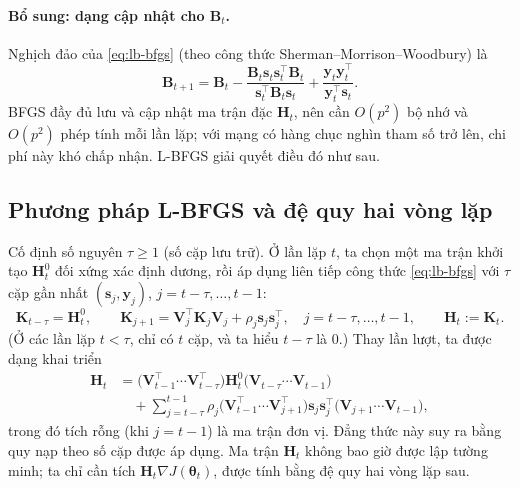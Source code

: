 \paragraph{Bổ sung: dạng cập nhật cho $\mathbf{B}_t$.}
Nghịch đảo của \eqref{eq:lb-bfgs} (theo công thức Sherman--\allowbreak Morrison--\allowbreak Woodbury) là
\begin{equation*}
  \mathbf{B}_{t+1}=\mathbf{B}_t-\frac{\mathbf{B}_t\mathbf{s}_t\mathbf{s}_t^{\top}\mathbf{B}_t}{\mathbf{s}_t^{\top}\mathbf{B}_t\mathbf{s}_t}+\frac{\mathbf{y}_t\mathbf{y}_t^{\top}}{\mathbf{y}_t^{\top}\mathbf{s}_t}.
\end{equation*}
BFGS đầy đủ lưu và cập nhật ma trận đặc $\mathbf{H}_t$, nên cần $O(p^2)$ bộ nhớ và $O(p^2)$ phép tính mỗi lần lặp; với mạng có hàng chục nghìn tham số trở lên, chi phí này khó chấp nhận. L-BFGS giải quyết điều đó như sau.

\subsection{Phương pháp L-BFGS và đệ quy hai vòng lặp}

Cố định số nguyên $\tau\ge1$ (số cặp lưu trữ). Ở lần lặp $t$, ta chọn một ma trận khởi tạo $\mathbf{H}_t^{0}$ đối xứng xác định dương, rồi áp dụng liên tiếp công thức \eqref{eq:lb-bfgs} với $\tau$ cặp gần nhất $(\mathbf{s}_j,\mathbf{y}_j)$, $j=t-\tau,\dots,t-1$:
\begin{equation}\label{eq:lb-K}
  \mathbf{K}_{t-\tau}=\mathbf{H}_t^{0},\qquad
  \mathbf{K}_{j+1}=\mathbf{V}_j^{\top}\mathbf{K}_j\mathbf{V}_j+\rho_j\mathbf{s}_j\mathbf{s}_j^{\top},\quad j=t-\tau,\dots,t-1,
  \qquad
  \mathbf{H}_t:=\mathbf{K}_t .
\end{equation}
(Ở các lần lặp $t<\tau$, chỉ có $t$ cặp, và ta hiểu $t-\tau$ là $0$.) Thay lần lượt, ta được dạng khai triển
\begin{equation}\label{eq:lb-expand}
  \begin{aligned}
  \mathbf{H}_t&=\big(\mathbf{V}_{t-1}^{\top}\cdots\mathbf{V}_{t-\tau}^{\top}\big)\mathbf{H}_t^{0}\big(\mathbf{V}_{t-\tau}\cdots\mathbf{V}_{t-1}\big)\\
  &\quad+\sum_{j=t-\tau}^{t-1}\rho_j\big(\mathbf{V}_{t-1}^{\top}\cdots\mathbf{V}_{j+1}^{\top}\big)\mathbf{s}_j\mathbf{s}_j^{\top}\big(\mathbf{V}_{j+1}\cdots\mathbf{V}_{t-1}\big),
  \end{aligned}
\end{equation}
trong đó tích rỗng (khi $j=t-1$) là ma trận đơn vị. Đẳng thức này suy ra bằng quy nạp theo số cặp được áp dụng. Ma trận $\mathbf{H}_t$ không bao giờ được lập tường minh; ta chỉ cần tích $\mathbf{H}_t\nabla J(\boldsymbol{\theta}_t)$, được tính bằng đệ quy hai vòng lặp sau.

